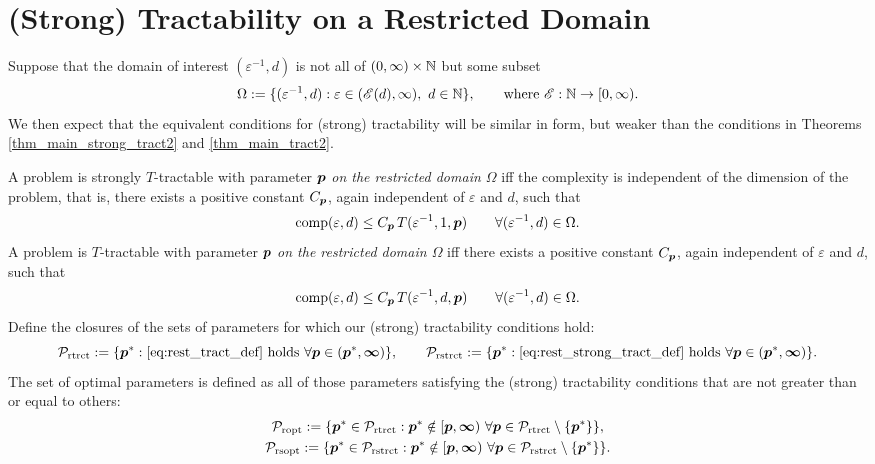 \documentclass[sort&compress]{elsarticle}
\newcommand{\theM}{\mathscr{E}}
\newcommand{\peter}[1]{\begingroup\color{violet}#1\endgroup}
\begin{document}
\section{(Strong) Tractability on a Restricted Domain}

Suppose that the domain of interest $(\varepsilon^{-1},d)$ is not all of $(0,\infty) \times \mathbb{N}$ but some subset
\begin{equation}
    \Omega  := \{(\varepsilon^{-1},d) : \varepsilon \in (\theM(d),\infty), \ d \in \naturals \}, \qquad \text{where }\theM : \naturals \to [0,\infty).
\end{equation}
We then expect that the equivalent conditions for (strong) tractability will be similar in form, but weaker than the conditions in Theorems  \ref{thm_main_strong_tract2} and \ref{thm_main_tract2}.

\begin{definition}
    A problem is strongly
$T$-tractable with parameter $\boldsymbol{p}$ \emph{on the restricted domain $\Omega$} iff the complexity is independent of the dimension of the problem, that is, there exists a positive constant $C_{\boldsymbol{p}}$, again independent of $\varepsilon$ and $d$, such that
\begin{equation} \label{eq:rest_strong_tract_def}
	\operatorname{comp}(\varepsilon,d) \le C_{\boldsymbol{p}}\, T(\varepsilon^{-1},1,\boldsymbol{p}) \qquad \forall(\varepsilon^{-1},d) \in \Omega.
\end{equation}
A problem is 
$T$-tractable with parameter $\boldsymbol{p}$ \emph{on the restricted domain $\Omega$} iff there exists a positive constant $C_{\boldsymbol{p}}$, again independent of $\varepsilon$ and $d$, such that
\begin{equation} \label{eq:rest_tract_def}
	\operatorname{comp}(\varepsilon,d) \le C_{\boldsymbol{p}}\, T(\varepsilon^{-1},d,\boldsymbol{p}) \qquad \forall(\varepsilon^{-1},d) \in \Omega.
\end{equation}
 Define the closures of the sets of parameters for which our (strong) tractability conditions hold:
\begin{equation*}
	\mathcal{P}_{\textup{rtrct}} : = \{\boldsymbol{p}^* : \eqref{eq:rest_tract_def} \text{ holds }\forall \boldsymbol{p} \in (\boldsymbol{p}^*,\boldsymbol{\infty})\}, \qquad
	\mathcal{P}_{\textup{rstrct}} : = \{\boldsymbol{p}^* : \eqref{eq:rest_strong_tract_def} \text{ holds }\forall \boldsymbol{p} \in (\boldsymbol{p}^*,\boldsymbol{\infty})\}.
\end{equation*}
    The  set of optimal parameters is defined as all of those parameters satisfying the (strong) tractability conditions that are not greater than or equal to others:
\begin{gather}
	\mathcal{P}_{\textup{ropt}} : = \{\boldsymbol{p}^* \in \mathcal{P}_{\textup{rtrct}} :  \boldsymbol{p}^* \notin [\boldsymbol{p},\boldsymbol{\infty}) \ \forall \boldsymbol{p} \in  \mathcal{P}_{\textup{rtrct}} \setminus \{\boldsymbol{p}^*\} \}, \\
	\mathcal{P}_{\textup{rsopt}} : = \{\boldsymbol{p}^* \in \mathcal{P}_{\textup{rstrct}} :  \boldsymbol{p}^* \notin [\boldsymbol{p},\boldsymbol{\infty}) \ \forall \boldsymbol{p} \in  \mathcal{P}_{\textup{rstrct}} \setminus \{\boldsymbol{p}^*\} \}.
\end{gather}
\end{definition}
\end{document}
